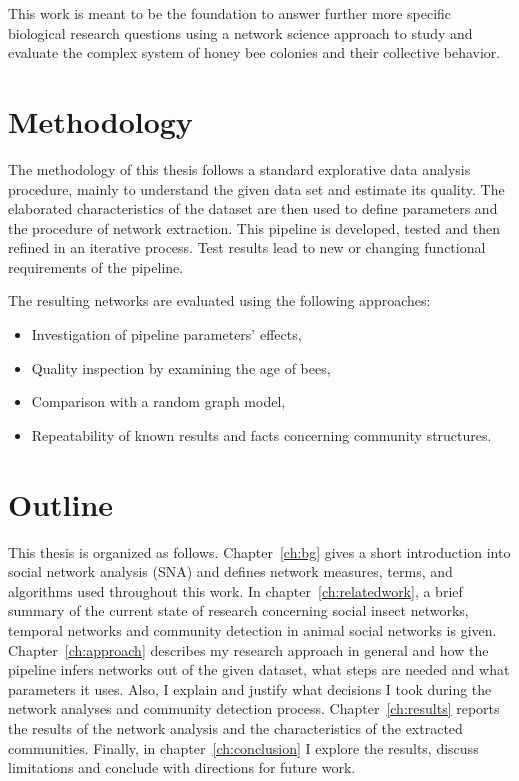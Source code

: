 This work is meant to be the foundation to answer further more specific biological research questions using a network science approach to study and evaluate the complex system of honey bee colonies and their collective behavior.

\section{Methodology}
The methodology of this thesis follows a standard explorative data analysis procedure, mainly to understand the given data set and estimate its quality. The elaborated characteristics of the dataset are then used to define parameters and the procedure of network extraction. This pipeline is developed, tested and then refined in an iterative process. Test results lead to new or changing functional requirements of the pipeline.

The resulting networks are evaluated using the following approaches:

\begin{itemize}
\item Investigation of pipeline parameters' effects,
\item Quality inspection by examining the age of bees,
\item Comparison with a random graph model,
\item Repeatability of known results and facts concerning community structures.
\end{itemize}

\section{Outline}
This thesis is organized as follows. Chapter~\ref{ch:bg} gives a short introduction into social network analysis (SNA) and defines network measures, terms, and algorithms used throughout this work.
In chapter~\ref{ch:relatedwork}, a brief summary of the current state of research concerning social insect networks, temporal networks and community detection in animal social networks is given.
Chapter~\ref{ch:approach} describes my research approach in general and how the pipeline infers networks out of the given dataset, what steps are needed and what parameters it uses.
Also, I explain and justify what decisions I took during the network analyses and community detection process.
Chapter~\ref{ch:results} reports the results of the network analysis and the characteristics of the extracted communities.
Finally, in chapter~\ref{ch:conclusion} I explore the results, discuss limitations and conclude with directions for future work.